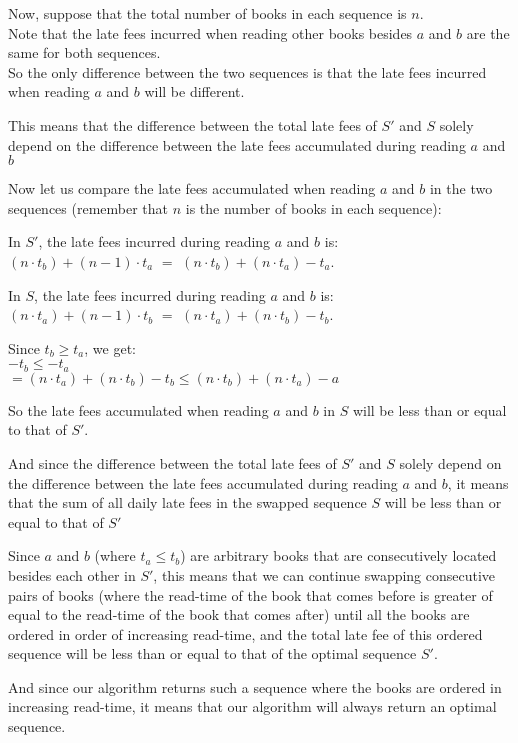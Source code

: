 \documentclass{article}
\begin{document}
Now, suppose that the total number of books in each sequence is $n$.\\
Note that the late fees incurred when reading other books besides $a$ and $b$ are the same for both sequences.\\ 
So the only difference between the two sequences is that the late fees incurred when reading $a$ and $b$ will be different.

This means that the difference between the total late fees of $S'$ and $S$ solely depend on the difference between the late fees accumulated during reading $a$ and $b$

Now let us compare the late fees accumulated when reading $a$ and $b$ in the two sequences (remember that $n$ is the number of books in each sequence):

In $S'$, the late fees incurred during reading $a$ and $b$ is:\\
$(n \cdot t_b) + (n-1) \cdot t_a$ $=$ $(n \cdot t_b) + (n \cdot t_a) - t_a$.

In $S$, the late fees incurred during reading $a$ and $b$ is:\\
$(n \cdot t_a) + (n-1) \cdot t_b$ $=$ $(n \cdot t_a) + (n \cdot t_b) - t_b$.

Since $t_b \geq t_a$, we get:\\
$-t_b \leq -t_a$\\
$= (n \cdot t_a) + (n \cdot t_b) - t_b \leq (n \cdot t_b) + (n \cdot t_a) - a$

So the late fees accumulated when reading $a$ and $b$ in $S$ will be less than or equal to that of $S'$.

And since the difference between the total late fees of $S'$ and $S$ solely depend on the difference between the late fees accumulated during reading $a$ and $b$, it means that the sum of all daily late fees in the swapped sequence $S$ will be less than or equal to that of $S'$

Since $a$ and $b$ (where $t_a \leq t_b$) are arbitrary books that are consecutively located besides each other in $S'$, this means that we can continue swapping consecutive pairs of books (where the read-time of the book that comes before is greater of equal to the read-time of the book that comes after) until all the books are ordered in order of increasing read-time, and the total late fee of this ordered sequence will be less than or equal to that of the optimal sequence $S'$.

And since our algorithm returns such a sequence where the books are ordered in increasing read-time, it means that our algorithm will always return an optimal sequence.
\end{document}
